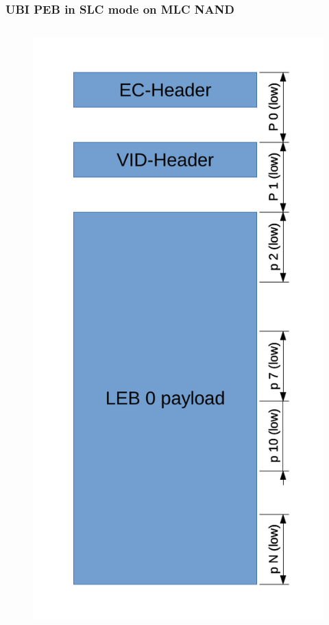 \documentclass[aspectratio=169,obeyspaces,spaces,hyphens,dvipsnames]{beamer}
\begin{document}
\begin{frame}[fragile]
\frametitle{UBI PEB in SLC mode on MLC NAND}
   \begin{columns}
     \begin{figure}
     \includegraphics[scale=0.33]{ubi_mlc_slcmode.pdf}

\end{figure}
\end{columns}
\end{frame}
\end{document}
